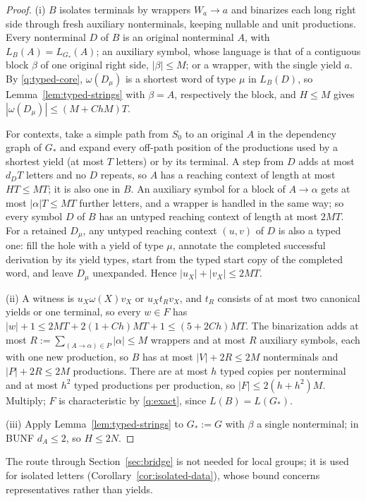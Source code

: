 \documentclass[11pt]{article}
\numberwithin{equation}{section}
\theoremstyle{plain}
\theoremstyle{definition}
\theoremstyle{remark}
\theoremstyle{plain}
\begin{document}
\begin{proof}
(i) $B$ isolates terminals by wrappers $W_a\to a$ and binarizes each long right
side through fresh auxiliary nonterminals, keeping nullable and unit
productions.  Every nonterminal $D$ of $B$ is an original nonterminal $A$, with
$L_B(A)=L_{G_*}(A)$; an auxiliary symbol, whose language is that of a contiguous
block $\beta$ of one original right side, $|\beta|\le M$; or a wrapper, with the
single yield $a$.  By \ref{q:typed-core}, $\omega(D_\mu)$ is a shortest word of type
$\mu$ in $L_B(D)$, so Lemma~\ref{lem:typed-strings} with $\beta=A$, respectively the
block, and $H\le M$ gives $|\omega(D_\mu)|\le(M+ChM)T$.

For contexts, take a simple path from $S_0$ to an original $A$ in the dependency
graph of $G_*$ and expand every off-path position of the productions used by a
shortest yield (at most $T$ letters) or by its terminal.  A step from $D$ adds at
most $d_DT$ letters and no $D$ repeats, so $A$ has a reaching context of length at
most $HT\le MT$; it is also one in $B$.  An auxiliary symbol for a block of
$A\to\alpha$ gets at most $|\alpha|T\le MT$ further letters, and a wrapper is
handled in the same way; so every symbol $D$ of $B$ has an untyped reaching
context of length at most $2MT$.  For a retained $D_\mu$, any untyped reaching
context $(u,v)$ of $D$ is also a typed one: fill the hole with a yield of type
$\mu$, annotate the completed successful derivation by its yield types, start
from the typed start copy of the completed word, and leave $D_\mu$ unexpanded.
Hence $|u_X|+|v_X|\le2MT$.

(ii) A witness is $u_X\omega(X)v_X$ or $u_Xt_Rv_X$, and $t_R$ consists of at
most two canonical yields or one terminal, so every $w\in F$ has
$|w|+1\le2MT+2(1+Ch)MT+1\le(5+2Ch)MT$.  The binarization adds at most
$R:=\sum_{(A\to\alpha)\in P}|\alpha|\le M$ wrappers and at most $R$ auxiliary
symbols, each with one new production, so $B$ has at most $|V|+2R\le2M$
nonterminals and $|P|+2R\le2M$ productions.  There are at most $h$ typed copies
per nonterminal and at most $h^2$ typed productions per production, so
$|F|\le2(h+h^2)M$.  Multiply; $F$ is characteristic by \ref{q:exact}, since
$L(B)=L(G_*)$.

(iii) Apply Lemma~\ref{lem:typed-strings} to $G_*:=G$ with $\beta$ a single
nonterminal; in BUNF $d_A\le2$, so $H\le2N$.
\end{proof}

The route through Section~\ref{sec:bridge} is not needed for local groups; it
is used for isolated letters (Corollary~\ref{cor:isolated-data}), whose bound
concerns representatives rather than yields.
\end{document}
